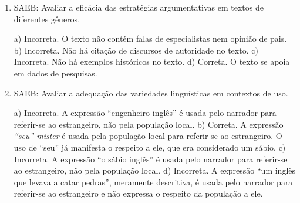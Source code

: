 \begin{enumerate}
	\item
SAEB: Avaliar a eficácia das estratégias argumentativas em textos de
diferentes gêneros.

a) Incorreta. O texto não contém falas de especialistas nem opinião de pais.
b) Incorreta. Não há citação de discursos de autoridade no texto.
c) Incorreta. Não há exemplos históricos no texto.
d) Correta. O texto se apoia em dados de pesquisas.

	\item
SAEB: Avaliar a adequação das variedades linguísticas em contextos de uso.

a) Incorreta. A expressão ``engenheiro inglês'' é usada pelo narrador para
referir-se ao estrangeiro, não pela população local.
b) Correta. A expressão \textit{``seu'' mister} é usada pela população local
para referir-se ao estrangeiro. O uso de ``seu'' já manifesta o respeito 
a ele, que era considerado um sábio. 
c) Incorreta. A expressão ``o sábio inglês'' é usada pelo narrador para
referir-se ao estrangeiro, não pela população local.
d) Incorreta. A expressão ``um inglês que levava a catar pedras'', meramente
descritiva, é usada pelo narrador para referir-se ao estrangeiro e não expressa
o respeito da população a ele.

\end{enumerate}
